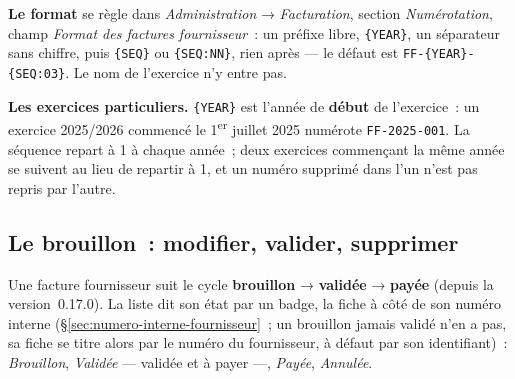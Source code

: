 \documentclass[a4paper,11pt,oneside]{article}
\begin{document}
\textbf{Le format} se règle dans \emph{Administration} → \emph{Facturation}, section \emph{Numérotation}, champ \emph{Format des factures fournisseur}~: un préfixe libre, \texttt{\{YEAR\}}, un séparateur sans chiffre, puis \texttt{\{SEQ\}} ou \texttt{\{SEQ:NN\}}, rien après --- le défaut est \texttt{FF-\{YEAR\}-\{SEQ:03\}}. Le nom de l'exercice n'y entre pas.

\textbf{Les exercices particuliers.} \texttt{\{YEAR\}} est l'année de \textbf{début} de l'exercice~: un exercice 2025/2026 commencé le 1\textsuperscript{er} juillet 2025 numérote \texttt{FF-2025-001}. La séquence repart à 1 à chaque année~; deux exercices commençant la même année se suivent au lieu de repartir à 1, et un numéro supprimé dans l'un n'est pas repris par l'autre.

\subsection{Le brouillon~: modifier, valider, supprimer}\label{sec:brouillon-fournisseur}

Une facture fournisseur suit le cycle \textbf{brouillon} → \textbf{validée} → \textbf{payée}
(depuis la version~0.17.0). La liste dit son état par un badge, la fiche à côté de son
numéro interne (\S\ref{sec:numero-interne-fournisseur}~; un brouillon jamais validé n'en a pas, sa fiche se titre alors par le numéro du fournisseur, à défaut par son identifiant)~: \emph{Brouillon},
\emph{Validée} --- validée et à payer ---, \emph{Payée}, \emph{Annulée}.
\end{document}
